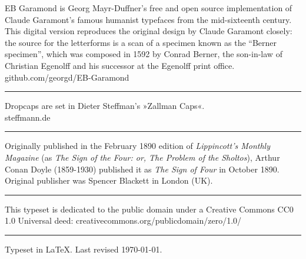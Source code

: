 \documentclass[
a5paper,
BCOR=7mm,
twoside,
DIV=calc,
11pt,
usegeometry,
chapterprefix,
endperiod,
headings=big]{scrbook} %
\begin{document}
EB Garamond is Georg Mayr-Duffner's free and open source implementation of Claude Garamont’s famous humanist typefaces from the mid-sixteenth century. This digital version reproduces the original design by Claude Garamont closely: the source for the letterforms is a scan of a specimen known as the \enquote{Berner specimen}, which was composed in 1592 by Conrad Berner, the son-in-law of Christian Egenolff and his successor at the Egenolff print office. \\
github.com/georgd/EB-Garamond
\vfill
\rule{0.5\textwidth}{.4pt}
\vfill
Dropcaps are set in Dieter Steffman's »Zallman Caps«.\\steffmann.de
\vfill
\rule{0.5\textwidth}{.4pt}
\vfill
Originally published in the February 1890 edition of \textit{Lippincott's Monthly Magazine} (as \textit{The Sign of the Four: or, The Problem of the Sholtos}), Arthur Conan Doyle (1859-1930) published it as \textit{The Sign of Four} in October 1890. Original publisher was Spencer Blackett in London (UK).
\vfill
\rule{0.5\textwidth}{.4pt}
\vfill
This typeset is dedicated to the public domain under a Creative Commons CC0 1.0 Universal deed: creativecommons.org/publicdomain/zero/1.0/
\vfill
\rule{0.5\textwidth}{.4pt}
\vfill
Typeset in \LaTeX{}. Last revised \today.
\thispagestyle{empty}
\end{document}
